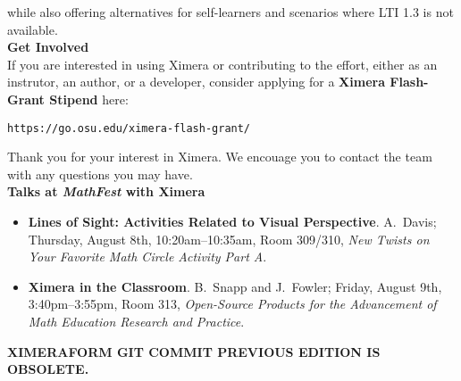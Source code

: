 \documentclass{article}
\begin{document}
\begin{multicols}{2}
\begin{center}
    \end{center}
    while also offering alternatives for self-learners and scenarios where LTI 1.3 is not
    available.
    \\[.5cm]
    {\sffamily\bfseries Get Involved}\\
    If you are interested in using Ximera or contributing to the effort, either
    as an instrutor, an author, or a developer, consider
    applying for a \textbf{Ximera Flash-Grant Stipend} here:
    \begin{center}
        \tt  https://go.osu.edu/ximera-flash-grant/
    \end{center}
    Thank you for your interest in Ximera. We encouage you
    to contact the team with  any questions you may have.
    \\[.5cm]
    {\sffamily\bfseries Talks at \textsl{MathFest} with Ximera}\\
    \begin{itemize}
        \item[{[1]}] \textbf{Lines of Sight: Activities Related to Visual
            Perspective}. A.\ Davis; Thursday, August 8th, 10:20am--10:35am,
        Room 309/310,
        \textit{New Twists on Your Favorite Math Circle Activity Part A}.
        \item[{[2]}] \textbf{Ximera in the Classroom}. B.\ Snapp and J.\
        Fowler;
        Friday, August 9th, 3:40pm--3:55pm, Room 313, \textit{Open-Source
            Products for
            the Advancement of Math Education Research and Practice}.
    \end{itemize}
\end{multicols}
\vfill
\sffamily\tiny\textbf{XIMERA\quad FORM  \quad GIT \quad COMMIT \quad
     \quad PREVIOUS \quad EDITION \quad IS
    \quad
    OBSOLETE.}
\end{document}
